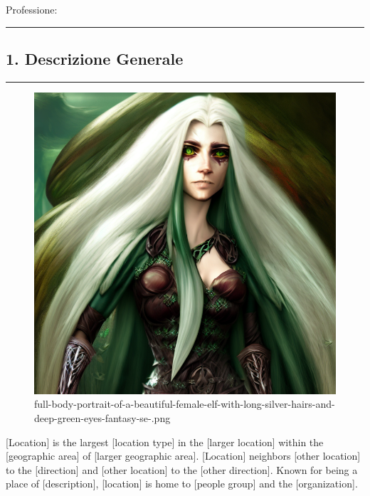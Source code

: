 Professione:

\begin{center}\rule{0.5\linewidth}{0.5pt}\end{center}

\subsection{1. Descrizione Generale}\label{descrizione-generale}

\begin{center}\rule{0.5\linewidth}{0.5pt}\end{center}

\begin{figure}
\centering
\includegraphics{full-body-portrait-of-a-beautiful-female-elf-with-long-silver-hairs-and-deep-green-eyes-fantasy-se-.png}
\caption{full-body-portrait-of-a-beautiful-female-elf-with-long-silver-hairs-and-deep-green-eyes-fantasy-se-.png}
\end{figure}

{[}Location{]} is the largest {[}location type{]} in the {[}larger
location{]} within the {[}geographic area{]} of {[}larger geographic
area{]}. {[}Location{]} neighbors {[}other location{]} to the
{[}direction{]} and {[}other location{]} to the {[}other direction{]}.
Known for being a place of {[}description{]}, {[}location{]} is home to
{[}people group{]} and the {[}organization{]}.

